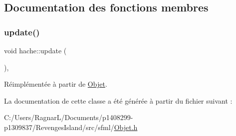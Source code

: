 \subsection{Documentation des fonctions membres}
\mbox{\label{classhache_a0b491958a8b90c3f6cc79e28e094a410}} 
\subsubsection{\texorpdfstring{update()}{update()}}
{\footnotesize\ttfamily void hache\+::update (\begin{DoxyParamCaption}{ }\end{DoxyParamCaption})\hspace{0.3cm}{\ttfamily [inline]}, {\ttfamily [virtual]}}



Réimplémentée à partir de \hyperlink{class_objet_a684611b20eb6e6df5e4743dd3e42385a}{Objet}.



La documentation de cette classe a été générée à partir du fichier suivant \+:\begin{DoxyCompactItemize}
\item 
C\+:/\+Users/\+Ragnar\+L/\+Documents/p1408299-\/p1309837/\+Revenges\+Island/src/sfml/\hyperlink{_objet_8h}{Objet.\+h}\end{DoxyCompactItemize}
